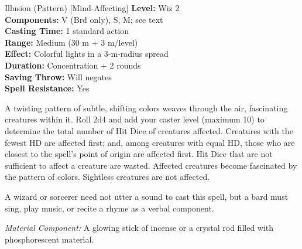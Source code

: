 {Illusion (Pattern) [Mind-Affecting]}
{
	\textbf{Level:}
	Wiz 2\\
	\textbf{Components:}
	V (Brd only), S, M; see text\\
	\textbf{Casting Time:}
	1 standard action\\
	\textbf{Range:}
	Medium (30 m + 3 m/level)\\
	\textbf{Effect:}
	Colorful lights in a 3-m-radius spread\\
	\textbf{Duration:}
	Concentration + 2 rounds\\
	\textbf{Saving Throw:}
	Will negates\\
	\textbf{Spell Resistance:}
	Yes\\
}
{
	A twisting pattern of subtle, shifting colors weaves through the air, fascinating creatures within it. Roll 2d4 and add your caster level (maximum 10) to determine the total number of Hit Dice of creatures affected. Creatures with the fewest HD are affected first; and, among creatures with equal HD, those who are closest to the spell's point of origin are affected first. Hit Dice that are not sufficient to affect a creature are wasted. Affected creatures become fascinated by the pattern of colors. Sightless creatures are not affected.

	A wizard or sorcerer need not utter a sound to cast this spell, but a bard must sing, play music, or recite a rhyme as a verbal component.

	\textit{Material Component:}
	A glowing stick of incense or a crystal rod filled with phosphorescent material.

}
